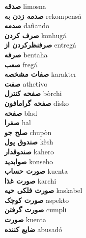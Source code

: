 \textbf{ صدقه  } limosna \\
\textbf{ صدمه زدن به  } rekompensá \\
\textbf{ صدمه  } dañando \\
\textbf{ صرف کردن  } konhugá \\
\textbf{ صرفنظرکردن از  } entregá \\
\textbf{ صرفه  } bentaha \\
\textbf{ صعب  } fregá \\
\textbf{ صفات مشخصه  } karakter \\
\textbf{ صفت  } athetivo \\
\textbf{ صفحه کنترل  } bòrchi \\
\textbf{ صفحه گرامافون  } disko \\
\textbf{ صفحه  } blad \\
\textbf{ صفرا  } hal \\
\textbf{ صلح جو  } chupòn \\
\textbf{ صندوق پول  } kèsh \\
\textbf{ صندوقدار  } kahero \\
\textbf{ صوابدید  } konseho \\
\textbf{ صورت حساب  } kuenta \\
\textbf{ صورت غذا  } karchi \\
\textbf{ صورت فلکی حیه  } kaskabel \\
\textbf{ صورت کوچک  } aspekto \\
\textbf{ صورت گرفتن  } cumpli \\
\textbf{ صورت  } kuenta \\
\textbf{ ضایع کننده  } abusadó \\
